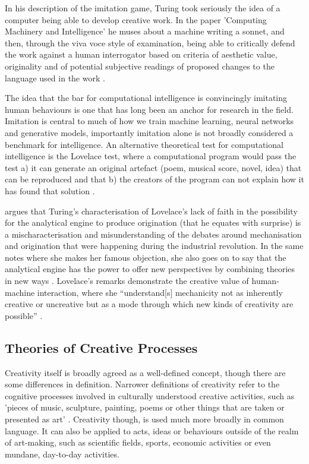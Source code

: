 In his description of the imitation game, Turing took seriously the idea of a computer being able to develop creative work. 
In the paper 'Computing Machinery and Intelligence' he muses about a machine writing a sonnet, and then, through the viva voce style of examination, being able to critically defend the work against a human interrogator based on criteria of aesthetic value, originality and of potential subjective readings of proposed changes to the language used in the work \citep{machinery1950computing}.

The idea that the bar for computational intelligence is  convincingly imitating human behaviours is one that has long been an anchor for research in the field. 
Imitation is central to much of how we train machine learning, neural networks and generative models, importantly imitation alone is not broadly considered a benchmark for intelligence.
An alternative theoretical test for computational intelligence is the Lovelace test, where a computational program would pass the test  a) it can generate an original artefact (poem, musical score, novel, idea) that can be reproduced and that b) the creators of the program can not explain how it  has found that solution \citep{bringsjord2003creativity}. 

\cite{ward2020computational} argues that Turing's characterisation of Lovelace's lack of faith in the possibility for the analytical engine to produce origination (that he equates with surprise) is a mischaracterisation and misunderstanding of the debates around mechanisation and origination that were happening during the industrial revolution. 
In the same notes where she makes her famous objection, she also goes on to say that the analytical engine has the power to offer new perspectives by combining theories in new ways  \citep{lovelace1843notes}.
 Lovelace's remarks demonstrate the creative value of human-machine interaction, where she ``understand[s] mechanicity not as inherently creative or uncreative but as a mode through which new kinds of creativity are possible'' \citep{ward2020computational}.

\subsection{Theories of Creative Processes}

Creativity itself is broadly agreed as a well-defined concept, though there are some differences in definition. 
Narrower definitions of creativity refer to the cognitive processes involved in culturally understood creative activities, such as 'pieces of music, sculpture, painting, poems or other things that are taken or presented as art' \citep{wiggins2015evolutionary}.
Creativity though, is used much more broadly in common language. 
It can also be applied to acts, ideas or behaviours outside of the realm of art-making, such as scientific fields, sports, economic activities or even mundane, day-to-day activities.


